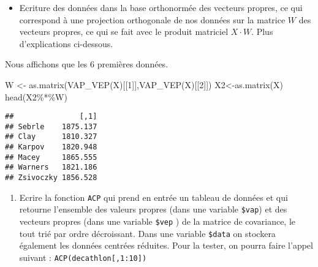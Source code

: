 \documentclass[
]{article}
\newenvironment{Shaded}{\begin{snugshade}}{\end{snugshade}}
\newcommand{\ControlFlowTok}[1]{\textcolor[rgb]{0.13,0.29,0.53}{\textbf{#1}}}
\newcommand{\DecValTok}[1]{\textcolor[rgb]{0.00,0.00,0.81}{#1}}
\newcommand{\FunctionTok}[1]{\textcolor[rgb]{0.00,0.00,0.00}{#1}}
\newcommand{\NormalTok}[1]{#1}
\newcommand{\OtherTok}[1]{\textcolor[rgb]{0.56,0.35,0.01}{#1}}
\newcommand{\SpecialCharTok}[1]{\textcolor[rgb]{0.00,0.00,0.00}{#1}}
\newcommand{\StringTok}[1]{\textcolor[rgb]{0.31,0.60,0.02}{#1}}
\providecommand{\tightlist}{%
  \setlength{\itemsep}{0pt}\setlength{\parskip}{0pt}}
\begin{document}
\begin{itemize}
\tightlist
\item
  Ecriture des données dans la base orthonormée des vecteurs propres, ce
  qui correspond à une projection orthogonale de nos données sur la
  matrice \(W\) des vecteurs propres, ce qui se fait avec le produit
  matriciel \(X \cdot W\). Plus d'explications ci-dessous.
\end{itemize}

Nous affichons que les 6 premières données.

\begin{Shaded}
\begin{Highlighting}[]
\NormalTok{W }\OtherTok{\textless{}{-}} \FunctionTok{as.matrix}\NormalTok{(}\FunctionTok{VAP\_VEP}\NormalTok{(X)[[}\DecValTok{1}\NormalTok{]],}\FunctionTok{VAP\_VEP}\NormalTok{(X)[[}\DecValTok{2}\NormalTok{]])}
\NormalTok{X2}\OtherTok{\textless{}{-}}\FunctionTok{as.matrix}\NormalTok{(X)}
\FunctionTok{head}\NormalTok{(X2}\SpecialCharTok{\%*\%}\NormalTok{W)}
\end{Highlighting}
\end{Shaded}

\begin{verbatim}
##               [,1]
## Sebrle    1875.137
## Clay      1810.327
## Karpov    1820.948
## Macey     1865.555
## Warners   1821.186
## Zsivoczky 1856.528
\end{verbatim}

\begin{enumerate}
\def\labelenumi{\arabic{enumi}.}
\tightlist
\item
  Ecrire la fonction \texttt{ACP} qui prend en entrée un tableau de
  données et qui retourne l'ensemble des valeurs propres (dans une
  variable \texttt{\$vap}) et des vecteurs propres (dans une variable
  \texttt{\$vep} ) de la matrice de covariance, le tout trié par ordre
  décroissant. Dans une variable \texttt{\$data} on stockera également
  les données centrées réduites. Pour la tester, on pourra faire l'appel
  suivant : \texttt{ACP(decathlon{[},1:10{]})}
\end{enumerate}

\begin{Shaded}
\end{Shaded}
\end{document}
